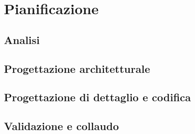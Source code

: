 \section{Pianificazione}
\subsection{Analisi}
\subsection{Progettazione architetturale}
\subsection{Progettazione di dettaglio e codifica}
\subsection{Validazione e collaudo}

